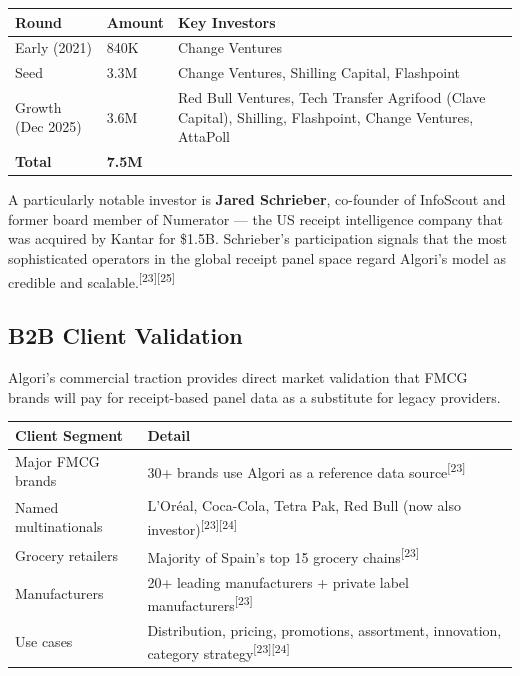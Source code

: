 \documentclass[11pt,a4paper]{article}
\begin{document}
\begin{center}
\renewcommand{\arraystretch}{1.35}
\begin{tabularx}{\textwidth}{L{2.5cm} R{2cm} L{9cm}}
\toprule
{}
\textbf{\color{white}Round} & \textbf{\color{white}Amount} & \textbf{\color{white}Key Investors} \\
\midrule
Early (2021) & \texteuro{}840K & Change Ventures \\
Seed & \texteuro{}3.3M & Change Ventures, Shilling Capital, Flashpoint \\
Growth (Dec 2025) & \texteuro{}3.6M & Red Bull Ventures, Tech Transfer Agrifood (Clave Capital), Shilling, Flashpoint, Change Ventures, AttaPoll \\
\midrule
{}
\textbf{Total} & \textbf{\texteuro{}7.5M} & \\
\bottomrule
\end{tabularx}
\end{center}

\vspace{0.4em}

A particularly notable investor is \textbf{Jared Schrieber}, co-founder of InfoScout and former board member of Numerator --- the US receipt intelligence company that was acquired by Kantar for \$1.5B. Schrieber's participation signals that the most sophisticated operators in the global receipt panel space regard Algori's model as credible and scalable.\textsuperscript{[23][25]}

\subsection{B2B Client Validation}

Algori's commercial traction provides direct market validation that FMCG brands will pay for receipt-based panel data as a substitute for legacy providers.

\begin{center}
\renewcommand{\arraystretch}{1.35}
\begin{tabularx}{\textwidth}{L{4.5cm} L{9cm}}
\toprule
{}
\textbf{\color{white}Client Segment} & \textbf{\color{white}Detail} \\
\midrule
Major FMCG brands & 30+ brands use Algori as a reference data source\textsuperscript{[23]} \\
Named multinationals & L'Or\'{e}al, Coca-Cola, Tetra Pak, Red Bull (now also investor)\textsuperscript{[23][24]} \\
Grocery retailers & Majority of Spain's top 15 grocery chains\textsuperscript{[23]} \\
Manufacturers & 20+ leading manufacturers + private label manufacturers\textsuperscript{[23]} \\
Use cases & Distribution, pricing, promotions, assortment, innovation, category strategy\textsuperscript{[23][24]} \\
\bottomrule
\end{tabularx}
\end{center}
\end{document}
